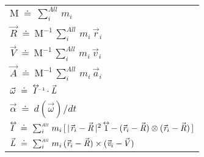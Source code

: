 \documentclass[10pt]{article}
\begin{document}
\par \bigskip\smallskip \hspace{-2.40em} \begin{tabular}{l}
${\mathrm{M}} ~\doteq~ \sum_i^{\scriptscriptstyle{\mathit{All}}} \, m_i$ \vspace{+1.20em} \\
${\vec{\mathit{R}}} ~\doteq~ {\mathrm{M}}^{\scriptscriptstyle -1} \, \sum_i^{\scriptscriptstyle{\mathit{All}}} \, m_i \, {\vec{\mathit{r}}_{i}}$ \vspace{+1.20em} \\
${\vec{\mathit{V}}} ~\doteq~ {\mathrm{M}}^{\scriptscriptstyle -1} \, \sum_i^{\scriptscriptstyle{\mathit{All}}} \, m_i \, {\vec{\mathit{v}}_{i}}$ \vspace{+1.20em} \\
${\vec{\mathit{A}}} ~\doteq~ {\mathrm{M}}^{\scriptscriptstyle -1} \, \sum_i^{\scriptscriptstyle{\mathit{All}}} \, m_i \, {\vec{\mathit{a}}_{i}}$ \vspace{+1.20em} \\
${\vec{\omega}} ~\doteq~ {\mathit{I}}^{\scriptscriptstyle -1}{\vphantom{\sum_1^2}}^{\hspace{-1.500em}\leftrightarrow}\hspace{+0.600em} \cdot {\vec{\mathit{L}}}$ \vspace{+1.20em} \\
${\vec{\alpha}} ~\doteq~ d({\vec{\omega}})/dt$ \vspace{+1.20em} \\
${\mathit{I}}{\vphantom{\sum_1^2}}^{\hspace{-0.555em}\leftrightarrow}\hspace{-0.210em} ~\doteq~ \sum_i^{\scriptscriptstyle{\mathit{All}}} \, m_i \, [ \, |\hspace{+0.090em}{\vec{\mathit{r}}_{i}} - {\vec{\mathit{R}}}\,|^2 \hspace{+0.309em} {\mathrm{1}}{\vphantom{\sum_1^2}}^{\hspace{-0.639em}\leftrightarrow}\hspace{-0.129em} - ({\vec{\mathit{r}}_{i}} - {\vec{\mathit{R}}}) \otimes ({\vec{\mathit{r}}_{i}} - {\vec{\mathit{R}}}) \, ]$ \vspace{+1.20em} \\
${\vec{\mathit{L}}} ~\doteq~ \sum_i^{\scriptscriptstyle{\mathit{All}}} \, m_i \, ({\vec{\mathit{r}}_{i}} - {\vec{\mathit{R}}}) \times ({\vec{\mathit{v}}_{i}} - \hspace{-0.120em}{\vec{\mathit{V}}})$
\end{tabular}
\end{document}
